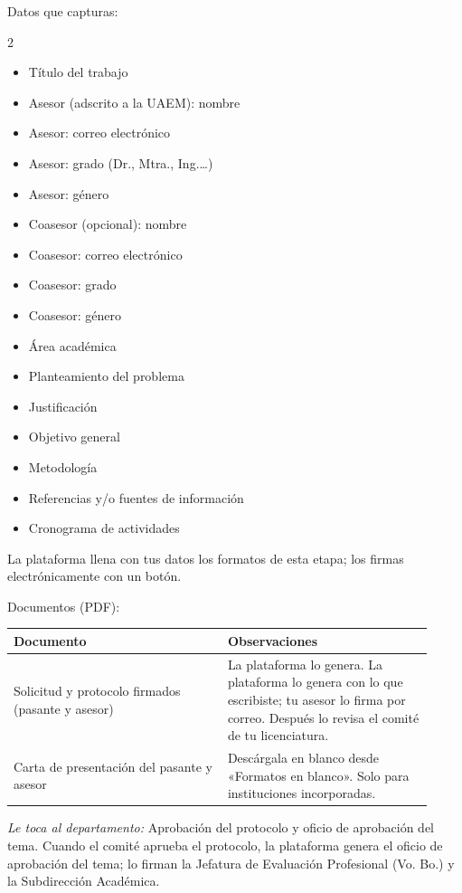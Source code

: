 Datos que capturas:
\begin{multicols}{2}\small
\begin{itemize}
  \item Título del trabajo
  \item Asesor (adscrito a la UAEM): nombre
  \item Asesor: correo electrónico
  \item Asesor: grado (Dr., Mtra., Ing.…)
  \item Asesor: género
  \item Coasesor (opcional): nombre
  \item Coasesor: correo electrónico
  \item Coasesor: grado
  \item Coasesor: género
  \item Área académica
  \item Planteamiento del problema
  \item Justificación
  \item Objetivo general
  \item Metodología
  \item Referencias y/o fuentes de información
  \item Cronograma de actividades
\end{itemize}
\end{multicols}

La plataforma llena con tus datos los formatos de esta etapa; los firmas electrónicamente con un botón.

Documentos (PDF):
{\small\begin{longtable}{>{\raggedright\arraybackslash}p{0.47\linewidth}>{\raggedright\arraybackslash}p{0.45\linewidth}}
\toprule
\textbf{Documento} & \textbf{Observaciones}\\
\midrule
\endhead
Solicitud y protocolo firmados (pasante y asesor) & La plataforma lo genera. La plataforma lo genera con lo que escribiste; tu asesor lo firma por correo. Después lo revisa el comité de tu licenciatura.\\
Carta de presentación del pasante y asesor & Descárgala en blanco desde «Formatos en blanco». Solo para instituciones incorporadas.\\
\bottomrule
\end{longtable}}

\emph{Le toca al departamento:} Aprobación del protocolo y oficio de aprobación del tema. Cuando el comité aprueba el protocolo, la plataforma genera el oficio de aprobación del tema; lo firman la Jefatura de Evaluación Profesional (Vo. Bo.) y la Subdirección Académica.
